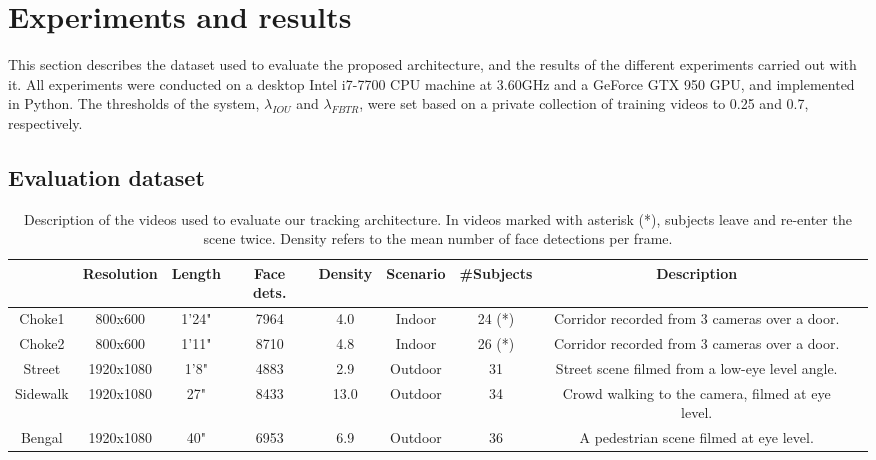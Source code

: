 
\section{Experiments and results}

This section describes the dataset used to evaluate the proposed architecture, and the results of the different experiments carried out with it. All experiments were conducted on a desktop Intel i7-7700 CPU machine at 3.60GHz and a GeForce GTX 950 GPU, and implemented in Python. The thresholds of the system, $\lambda_{IOU}$ and $\lambda_{FBTR}$, were set based on a private collection of training videos to 0.25 and 0.7, respectively.

\subsection{Evaluation dataset}

\begin{table}[h!]
    \centering
    \small
    \begin{tabular}{ccccccccc}
        \toprule
         & Resolution & Length & Face dets. & Density & Scenario & \#Subjects & Description \\
         \midrule
        Choke1 & 800x600 & 1'24" & 7964 & 4.0 & Indoor & 24 (*) & Corridor recorded from 3 cameras over a door.\\
        Choke2 & 800x600 & 1'11" & 8710 & 4.8 & Indoor & 26 (*) & Corridor recorded from 3 cameras over a door.\vspace{1mm}\\
        Street & 1920x1080 & 1'8" & 4883 & 2.9 & Outdoor & 31 & Street scene filmed from a low-eye level angle.\\
        Sidewalk & 1920x1080 & 27" & 8433 & 13.0 & Outdoor & 34 &  Crowd walking to the camera, filmed at eye level.\\
        Bengal & 1920x1080 & 40" & 6953 & 6.9 & Outdoor & 36 & A pedestrian scene filmed at eye level.\\
         \bottomrule
    \end{tabular}
    \caption{Description of the videos used to evaluate our tracking architecture. In videos marked with asterisk (*), subjects leave and re-enter the scene twice. Density refers to the mean number of face detections per frame.}
    \label{tab:videos}
\end{table}


